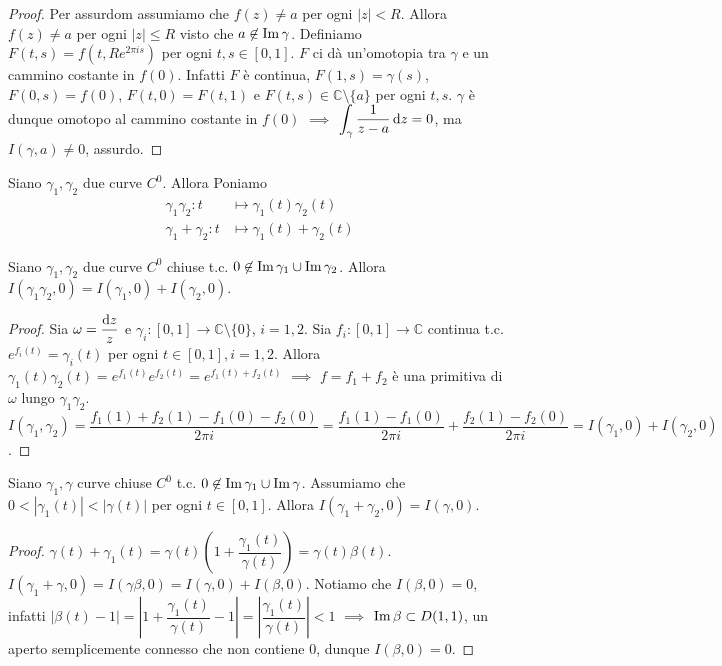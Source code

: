 \begin{proof}
  Per assurdom assumiamo che $f(z)\not=a$ per ogni $|z|<R$. Allora $f(z)\not=a$ per ogni $|z| \le R$ visto che $a \not\in \operatorname{Im}{\gamma}$. Definiamo $F(t,s)=f(t, Re^{2\pi is})$ per ogni $t,s \in [0,1]$. $F$ ci dà un'omotopia tra $\gamma$ e un cammino costante in $f(0)$.
  Infatti $F$ è continua, $F(1,s)=\gamma(s)$, $F(0,s)=f(0)$, $F(t,0)=F(t,1)$ e $F(t, s) \in \mathbb{C}\setminus\{a\}$ per ogni $t, s$. $\gamma$ è dunque omotopo al cammino costante in $f(0)$ $\implies$ $\displaystyle \int_{\gamma} \frac{1}{z-a}\mathop{}\!\mathrm{d} z=0$, ma $I(\gamma, a)\not=0$, assurdo.
\end{proof}

\begin{defn}
  Siano $\gamma_1, \gamma_2$ due curve $C^0$. Allora Poniamo
  \begin{align*}
    \gamma_1\gamma_2:t &\longmapsto \gamma_1(t)\gamma_2(t)\\
    \gamma_1+\gamma_2:t &\longmapsto \gamma_1(t)+\gamma_2(t)
  \end{align*}
\end{defn}

\begin{thm}
  Siano $\gamma_1, \gamma_2$ due curve $C^0$ chiuse t.c. $0 \not\in \operatorname{Im}{\gamma_1}\cup\operatorname{Im}{\gamma_2}$. Allora $I(\gamma_1\gamma_2, 0)=I(\gamma_1, 0)+I(\gamma_2, 0)$.
\end{thm}

\begin{proof}
  Sia $\omega=\dfrac{\mathop{}\!\mathrm{d} z}{z}$ e $\gamma_i:[0,1] \longrightarrow \mathbb{C}\setminus\{0\}$, $i=1,2$. Sia $f_i:[0,1] \longrightarrow \mathbb{C}$ continua t.c. $e^{f_i(t)}=\gamma_i(t)$ per ogni $t \in [0,1], i=1,2$.
  Allora $\gamma_1(t)\gamma_2(t)=e^{f_1(t)}e^{f_2(t)}=e^{f_1(t)+f_2(t)}$ $\implies$ $f=f_1+f_2$ è una primitiva di $\omega$ lungo $\gamma_1\gamma_2$. $I(\gamma_1, \gamma_2)=\dfrac{f_1(1)+f_2(1)-f_1(0)-f_2(0)}{2\pi i}=\dfrac{f_1(1)-f_1(0)}{2\pi i}+\dfrac{f_2(1)-f_2(0)}{2\pi i}=I(\gamma_1, 0)+I(\gamma_2, 0)$.
\end{proof}

\begin{thm}
  Siano $\gamma_1, \gamma$ curve chiuse $C^0$ t.c. $0 \not\in \operatorname{Im}{\gamma_1}\cup\operatorname{Im}{\gamma}$. Assumiamo che $0<|\gamma_1(t)|<|\gamma(t)|$ per ogni $t \in [0,1]$. Allora $I(\gamma_1+\gamma_2, 0)=I(\gamma, 0)$.
\end{thm}

\begin{proof}
  $\gamma(t)+\gamma_1(t)=\gamma(t)\left(1+\dfrac{\gamma_1(t)}{\gamma(t)}\right)=\gamma(t)\beta(t)$. $I(\gamma_1+\gamma, 0)=I(\gamma\beta, 0)=I(\gamma, 0)+I(\beta, 0)$.
  Notiamo che $I(\beta, 0)=0$, infatti $|\beta(t)-1|=\left|1+\dfrac{\gamma_1(t)}{\gamma(t)}-1 \right|=\left|\dfrac{\gamma_1(t)}{\gamma(t)} \right|<1$ $\implies$ $\operatorname{Im}{\beta} \subset D(1,1)$, un aperto semplicemente connesso che non contiene $0$, dunque $I(\beta, 0)=0$.
\end{proof}

